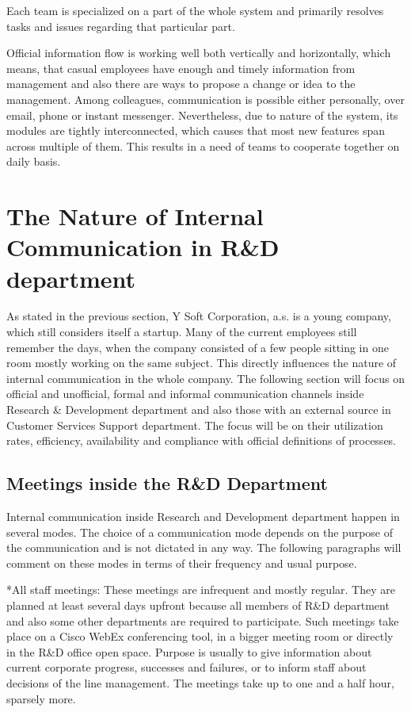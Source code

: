 \documentclass[11pt,singleside]{myfithesis2}
\makeatletter
\renewcommand\paragraph{
   \vspace{-10pt}
   \@startsection{paragraph}{4}{0mm}
      {\baselineskip}
      {- 5pt}
      {\normalfont\normalsize\bfseries}
}
\makeatother
\begin{document}
Each team is specialized on a part of the whole system and primarily resolves tasks and issues regarding that particular part. 

Official information flow is working well both vertically and horizontally, which means, that casual employees have enough and timely information from management and also there are ways to propose a change or idea to the management. Among colleagues, communication is possible either personally, over email, phone or instant messenger. Nevertheless, due to nature of the system, its modules are tightly interconnected, which causes that most new features span across multiple of them. This results in a need of teams to cooperate together on daily basis. 



	\section{The Nature of Internal Communication in R\&D department}
As stated in the previous section, Y Soft Corporation, a.s. is a young company, which still considers itself a startup. Many of the current employees still remember the days, when the company consisted of a few people sitting in one room mostly working on the same subject. This directly influences the nature of internal communication in the whole company. The following section will focus on official and unofficial, formal and informal communication channels inside Research \& Development department and also those with an external source in Customer Services Support department. The focus will be on their utilization rates, efficiency, availability and compliance with official definitions of processes.


		\subsection{Meetings inside the R\&D Department}\label{rndMeetings}
Internal communication inside Research and Development department happen in several modes. The choice of a communication mode depends on the purpose of the communication and is not dictated in any way. The following paragraphs will comment on these modes in terms of their frequency and usual purpose.

\paragraph*{All staff meetings: } These meetings are infrequent and mostly regular. They are planned at least several days upfront because all members of R\&D department and also some other departments are required to participate. Such meetings take place on a Cisco WebEx conferencing tool, in a bigger meeting room or directly in the R\&D office open space. Purpose is usually to give information about current corporate progress, successes and failures, or to inform staff about decisions of the line management. The meetings take up to one and a half hour, sparsely more.
\end{document}
